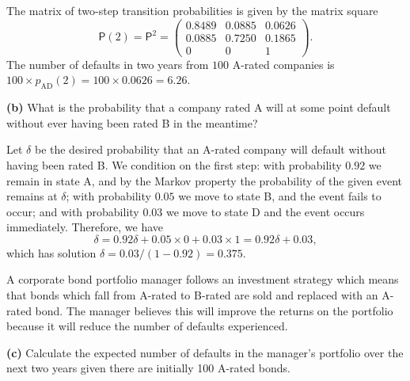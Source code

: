\documentclass[
  a4paper,
]{article}
\theoremstyle{definition}
\theoremstyle{definition}
\theoremstyle{definition}
\theoremstyle{remark}
\begin{document}
\begin{myanswers}
The matrix of two-step transition probabilities is given by the matrix square
\[\mathsf P(2) = \mathsf P^2= \begin{pmatrix} 0.8489&0.0885&0.0626\\
0.0885&0.7250&0.1865\\
0&0&1 \end{pmatrix}. \]
The number of defaults in two years from \(100\) A-rated companies is \(100 \times p_{\mathrm{AD}}(2) = 100 \times 0.0626 = 6.26\).

\end{myanswers}

\textbf{(b)} What is the probability that a company rated A will at some point default without ever having been rated B in the meantime?

\begin{myanswers}
Let \(\delta\) be the desired probability that an A-rated company will default without having been rated B. We condition on the first step: with probability \(0.92\) we remain in state A, and by the Markov property the probability of the given event remains at \(\delta\); with probability \(0.05\) we move to state B, and the event fails to occur; and with probability \(0.03\) we move to state D and the event occurs immediately. Therefore, we have
\[ \delta = 0.92\delta + 0.05\times 0 + 0.03 \times 1 = 0.92\delta + 0.03 ,  \]
which has solution \(\delta = 0.03/(1-0.92) = 0.375\).

\end{myanswers}

A corporate bond portfolio manager follows an investment strategy which means that bonds which fall from A-rated to B-rated are sold and replaced with an A-rated bond. The manager believes this will improve the returns on the portfolio because it will reduce the number of defaults experienced.

\textbf{(c)} Calculate the expected number of defaults in the manager's portfolio over the next two years given there are initially 100 A-rated bonds.
\end{document}
